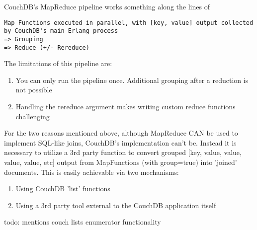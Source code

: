 CouchDB's MapReduce pipeline works something along the lines of

\begin{verbatim}
Map Functions executed in parallel, with [key, value] output collected by CouchDB's main Erlang process
=> Grouping
=> Reduce (+/- Rereduce)
\end{verbatim}

The limitations of this pipeline are:

\begin{enumerate}
    \item You can only run the pipeline once. Additional grouping after a reduction is not possible
    \item Handling the rereduce argument makes writing custom reduce functions challenging
\end{enumerate}

For the two reasons mentioned above, although MapReduce CAN be used to implement SQL-like joins, CouchDB's implementation can't be. Instead it is necessary to utilize a 3rd party function to convert grouped [key, value, value, value, value, etc] output from MapFunctions (with group=true) into 'joined' documents. This is easily achievable via two mechanisms:

\begin{enumerate}
    \item Using CouchDB 'list' functions
    \item Using a 3rd party tool external to the CouchDB application itself
\end{enumerate}

todo: mentions couch lists enumerator functionality